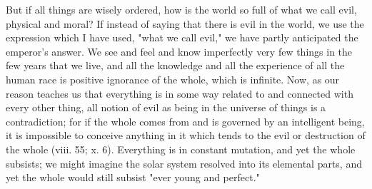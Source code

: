 But if all things are wisely ordered, how is the world so full of what we call evil, physical and moral? If instead of saying that there is evil in the world, we use the expression which I have used, "what we call evil," we have partly anticipated the emperor's answer. We see and feel and know imperfectly very few things in the few years that we live, and all the knowledge and all the experience of all the human race is positive ignorance of the whole, which is infinite. Now, as our reason teaches us that everything is in some way related to and connected with every other thing, all notion of evil as being in the universe of things is a contradiction; for if the whole comes from and is governed by an intelligent being, it is impossible to conceive anything in it which tends to the evil or destruction of the whole (viii. 55; x. 6). Everything is in constant mutation, and yet the whole subsists; we might imagine the solar system resolved into its elemental parts, and yet the whole would still subsist "ever young and perfect."

